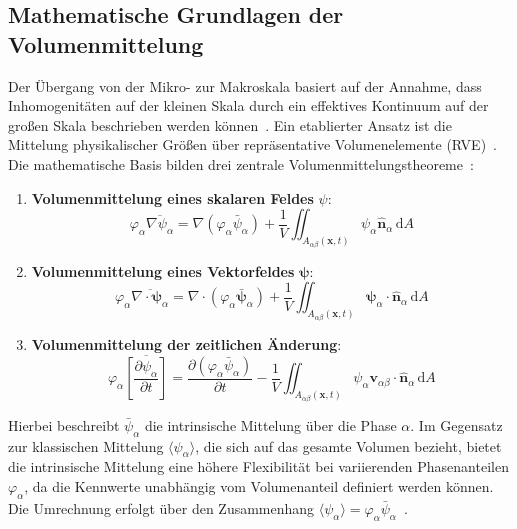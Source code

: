 \subsection{Mathematische Grundlagen der Volumenmittelung}

Der Übergang von der Mikro- zur Makroskala basiert auf der Annahme, dass Inhomogenitäten auf der kleinen Skala durch ein effektives Kontinuum auf der großen Skala beschrieben werden können~\cite{Plett2024}. Ein etablierter Ansatz ist die Mittelung physikalischer Größen über repräsentative Volumenelemente (RVE)~\cite{Burow2016,Arunachalam2019,Li2020}. Die mathematische Basis bilden drei zentrale Volumenmittelungstheoreme~\cite{Gray1977}:

\begin{enumerate}
    \item \textbf{Volumenmittelung eines skalaren Feldes} $\psi$:
    \begin{equation}
        \varphi_{\alpha} \overline{\nabla \psi_{\alpha}} = \nabla \left(\varphi_{\alpha} \bar{\psi}_{\alpha} \right) + \frac{1}{V} \iint_{A_{\alpha \beta}(\boldsymbol{x},t)}\psi_{\alpha} \hat{\boldsymbol{n}}_{\alpha} \,\mathrm{d}A
    \end{equation}
    \item \textbf{Volumenmittelung eines Vektorfeldes} $\boldsymbol{\psi}$:
    \begin{equation}
        \varphi_{\alpha} \overline{\nabla \cdot \boldsymbol{\psi}_{\alpha}} = \nabla \cdot \left(\varphi_{\alpha} \bar{\boldsymbol{\psi}}_{\alpha} \right) + \frac{1}{V} \iint_{A_{\alpha \beta}(\boldsymbol{x},t)}\boldsymbol{\psi}_{\alpha} \cdot \hat{\boldsymbol{n}}_{\alpha} \,\mathrm{d}A
    \end{equation}
    \item \textbf{Volumenmittelung der zeitlichen Änderung}:
    \begin{equation}
        \varphi_{\alpha} \overline{\left[\frac{\partial \psi_{\alpha}}{\partial t}\right]} = \frac{\partial \left(\varphi_{\alpha} \bar{\psi}_{\alpha} \right)}{\partial t} - \frac{1}{V} \iint_{A_{\alpha \beta}(\boldsymbol{x},t)}\psi_{\alpha} \boldsymbol{v}_{\alpha \beta} \cdot \hat{\boldsymbol{n}}_{\alpha} \,\mathrm{d}A
    \end{equation}
\end{enumerate}

Hierbei beschreibt $\bar{\psi}_{\alpha}$ die intrinsische Mittelung über die Phase $\alpha$. Im Gegensatz zur klassischen Mittelung $\langle \psi_{\alpha} \rangle$, die sich auf das gesamte Volumen bezieht, bietet die intrinsische Mittelung eine höhere Flexibilität bei variierenden Phasenanteilen $\varphi_{\alpha}$, da die Kennwerte unabhängig vom Volumenanteil definiert werden können. Die Umrechnung erfolgt über den Zusammenhang $\langle \psi_{\alpha} \rangle = \varphi_{\alpha} \bar{\psi}_{\alpha}$~\cite{Doyle1995}.

